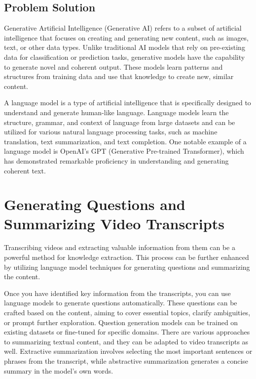 \subsection{Problem Solution}

Generative Artificial Intelligence (Generative AI) refers to a subset of artificial intelligence that focuses on creating and generating new content, such as images, text, or other data types. Unlike traditional AI models that rely on pre-existing data for classification or prediction tasks, generative models have the capability to generate novel and coherent output. These models learn patterns and structures from training data and use that knowledge to create new, similar content.

A language model is a type of artificial intelligence that is specifically designed to understand and generate human-like language. Language models learn the structure, grammar, and context of language from large datasets and can be utilized for various natural language processing tasks, such as machine translation, text summarization, and text completion. One notable example of a language model is OpenAI's GPT (Generative Pre-trained Transformer), which has demonstrated remarkable proficiency in understanding and generating coherent text.

\section{Generating Questions and Summarizing Video Transcripts}

Transcribing videos and extracting valuable information from them can be a powerful method for knowledge extraction. This process can be further enhanced by utilizing language model techniques for generating questions and summarizing the content.

Once you have identified key information from the transcripts, you can use language models to generate questions automatically. These questions can be crafted based on the content, aiming to cover essential topics, clarify ambiguities, or prompt further exploration. Question generation models can be trained on existing datasets or fine-tuned for specific domains. There are various approaches to summarizing textual content, and they can be adapted to video transcripts as well. Extractive summarization involves selecting the most important sentences or phrases from the transcript, while abstractive summarization generates a concise summary in the model's own words.

